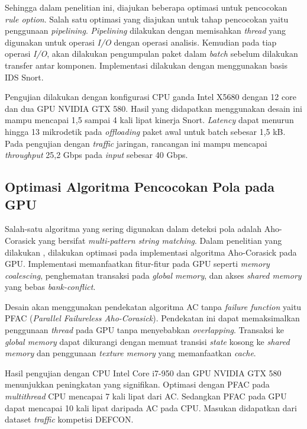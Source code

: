     Sehingga dalam penelitian ini, diajukan beberapa optimasi untuk pencocokan \emph{rule option}. Salah satu optimasi yang diajukan untuk tahap pencocokan yaitu penggunaan \emph{pipelining}. \emph{Pipelining} dilakukan dengan memisahkan \emph{thread} yang digunakan untuk operasi \emph{I/O} dengan operasi analisis. Kemudian pada tiap operasi \emph{I/O}, akan dilakukan pengumpulan paket dalam \emph{batch} sebelum dilakukan transfer antar komponen. Implementasi dilakukan dengan menggunakan basis IDS Snort.

    Pengujian dilakukan dengan konfigurasi CPU ganda Intel X5680 dengan 12 core dan dua GPU NVIDIA GTX 580. Hasil yang didapatkan menggunakan desain ini mampu mencapai 1,5 sampai 4 kali lipat kinerja Snort. \emph{Latency} dapat menurun hingga 13 mikrodetik pada \emph{offloading} paket awal untuk batch sebesar 1,5 kB. Pada pengujian dengan \emph{traffic} jaringan, rancangan ini mampu mencapai \emph{throughput} 25,2 Gbps pada \emph{input} sebesar 40 Gbps.

  \subsection{Optimasi Algoritma Pencocokan Pola pada GPU}

    Salah-satu algoritma yang sering digunakan dalam deteksi pola adalah Aho-Corasick yang bersifat \emph{multi-pattern string matching}. Dalam penelitian yang dilakukan \cite{lin2013}, dilakukan optimasi pada implementasi algoritma Aho-Corasick pada GPU. Implementasi memanfaatkan fitur-fitur pada GPU seperti \emph{memory coalescing}, penghematan transaksi pada \emph{global memory}, dan akses \emph{shared memory} yang bebas \emph{bank-conflict}.

    Desain akan menggunakan pendekatan algoritma AC tanpa \emph{failure function} yaitu PFAC (\emph{Parallel Failureless Aho-Corasick}). Pendekatan ini dapat memaksimalkan penggunaan \emph{thread} pada GPU tanpa menyebabkan \emph{overlapping}. Transaksi ke \emph{global memory} dapat dikurangi dengan memuat transisi \emph{state} kosong ke \emph{shared memory} dan penggunaan \emph{texture memory} yang memanfaatkan \emph{cache}.

    Hasil pengujian dengan CPU Intel Core i7-950 dan GPU NVIDIA GTX 580 menunjukkan peningkatan yang signifikan. Optimasi dengan PFAC pada \emph{multithread} CPU mencapai 7 kali lipat dari AC. Sedangkan PFAC pada GPU dapat mencapai 10 kali lipat daripada AC pada CPU. Masukan didapatkan dari dataset \emph{traffic} kompetisi DEFCON.


